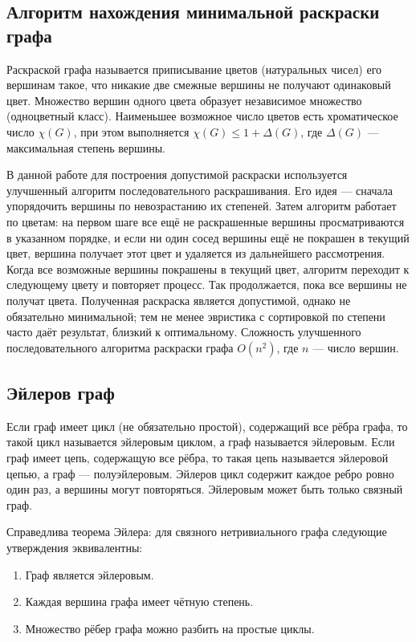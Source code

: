 \subsection{Алгоритм нахождения минимальной раскраски графа}
Раскраской графа называется приписывание цветов (натуральных чисел) его вершинам такое, что никакие две смежные вершины не получают одинаковый цвет. Множество вершин одного цвета образует независимое множество (одноцветный класс). Наименьшее возможное число цветов есть хроматическое число \(\chi(G)\), при этом выполняется \(\chi(G) \le 1 + \Delta(G)\), где \(\Delta(G)\) — максимальная степень вершины.

В данной работе для построения допустимой раскраски используется улучшенный алгоритм последовательного раскрашивания. Его идея — сначала упорядочить вершины по невозрастанию их степеней. Затем алгоритм работает по цветам: на первом шаге все ещё не раскрашенные вершины просматриваются в указанном порядке, и если ни один сосед вершины ещё не покрашен в текущий цвет, вершина получает этот цвет и удаляется из дальнейшего рассмотрения. Когда все возможные вершины покрашены в текущий цвет, алгоритм переходит к следующему цвету и повторяет процесс. Так продолжается, пока все вершины не получат цвета. Полученная раскраска является допустимой, однако не обязательно минимальной; тем не менее эвристика с сортировкой по степени часто даёт результат, близкий к оптимальному. Сложность улучшенного последовательного алгоритма раскраски графа $O(n^2)$, где $n$ — число вершин.

\subsection{Эйлеров граф}
Если граф имеет цикл (не обязательно простой), содержащий все рёбра графа, то такой цикл называется эйлеровым циклом, а граф называется эйлеровым. Если граф имеет цепь, содержащую все рёбра, то такая цепь называется эйлеровой цепью, а граф — полуэйлеровым. Эйлеров цикл содержит каждое ребро ровно один раз, а вершины могут повторяться. Эйлеровым может быть только связный граф.

Справедлива теорема Эйлера: для связного нетривиального графа следующие утверждения эквивалентны:
\begin{enumerate}
	\item Граф является эйлеровым.
	\item Каждая вершина графа имеет чётную степень.
	\item Множество рёбер графа можно разбить на простые циклы.
\end{enumerate}

